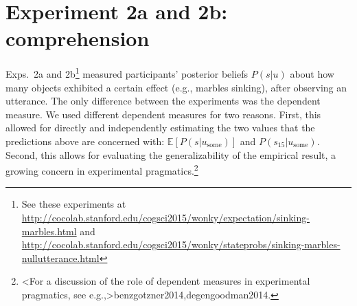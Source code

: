 \documentclass[10pt,letterpaper]{article}
\newcommand{\red}[1]{\textcolor{Red}{#1}}
\begin{document}
%




\section{Experiment 2a and 2b: comprehension}  


Exps.~2a and 2b\footnote{See these experiments at \url{http://cocolab.stanford.edu/cogsci2015/wonky/expectation/sinking-marbles.html} and \url{http://cocolab.stanford.edu/cogsci2015/wonky/stateprobs/sinking-marbles-nullutterance.html}}  measured participants' posterior beliefs $P(s|u)$ about how many objects exhibited a certain effect (e.g., marbles sinking), after observing an utterance. The only difference between the experiments was the dependent measure. We used different dependent measures for two reasons. First, this allowed for directly and independently estimating the two values that the  predictions above are concerned with: $\mathbb{E}[P(s|u_{\textrm{some}})]$ and $P(s_{15}|u_{\textrm{some}})$. Second, this allows for evaluating the generalizability of the empirical result, a growing concern in experimental pragmatics.\footnote{\citeA<For a discussion of the role of dependent measures in experimental pragmatics, see e.g.,>{benzgotzner2014,degengoodman2014}.}
\end{document}
